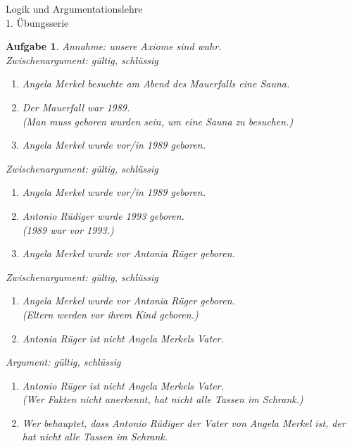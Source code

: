 \documentclass[11pt]{article}
\theoremstyle{break}
\newtheorem{task}{Aufgabe}
\newcommand{\hw}{1}
\begin{document}
\begin{center}
\Large{Logik und Argumentationslehre}\\
\large{\hw. Übungsserie}
\end{center}
\begin{task}
    Annahme: unsere Axiome sind wahr.\\
    Zwischenargument: gültig, schlüssig
    \begin{enumerate}
        \item[$\text{P}_1$:] Angela Merkel besuchte am Abend des Mauerfalls eine Sauna.
        \item[$\text{P}_2$:] Der Mauerfall war 1989.\vspace*{3mm}\\
        (Man muss geboren wurden sein, um eine Sauna zu besuchen.)
        \item[K] Angela Merkel wurde vor/in 1989 geboren.
    \end{enumerate}
    Zwischenargument: gültig, schlüssig
    \begin{enumerate}
        \item[$\text{P}_1$:] Angela Merkel wurde vor/in 1989 geboren.
        \item[$\text{P}_2$:] Antonio Rüdiger wurde 1993 geboren.\vspace*{3mm}\\
        (1989 war vor 1993.) 
        \item[K] Angela Merkel wurde vor Antonia Rüger geboren.
    \end{enumerate}
    Zwischenargument: gültig, schlüssig
    \begin{enumerate}
        \item[$\text{P}_1$:] Angela Merkel wurde vor Antonia Rüger geboren.\vspace*{3mm}\\
        (Eltern werden vor ihrem Kind geboren.)
        \item[K] Antonia Rüger ist nicht Angela Merkels Vater.
    \end{enumerate}
    Argument: gültig, schlüssig
    \begin{enumerate}
        \item[$\text{P}_1$:] Antonio Rüger ist nicht Angela Merkels Vater.\vspace*{3mm}\\
        (Wer Fakten nicht anerkennt, hat nicht alle Tassen im Schrank.)
        \item[K] Wer behauptet, dass Antonio Rüdiger der Vater von Angela Merkel ist, der hat nicht alle Tassen im Schrank.
    \end{enumerate}
\end{task}
\end{document}
